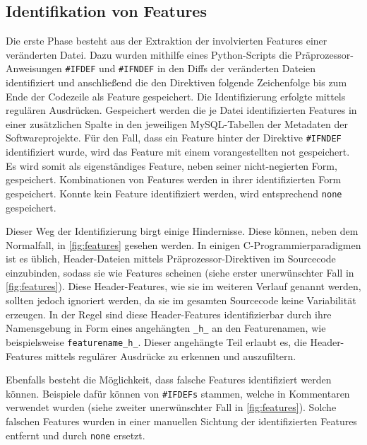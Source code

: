 \subsection*{Identifikation von Features}

Die erste Phase besteht aus der Extraktion der involvierten Features einer veränderten Datei. Dazu wurden mithilfe eines Python-Scripts die Präprozessor-Anweisungen \texttt{\#IFDEF} und \texttt{\#IFNDEF} in den Diffs der veränderten Dateien identifiziert und anschließend die den Direktiven folgende Zeichenfolge bis zum Ende der Codezeile als Feature gespeichert. Die Identifizierung erfolgte mittels regulären Ausdrücken. Gespeichert werden die je Datei identifizierten Features in einer zusätzlichen Spalte in den jeweiligen MySQL-Tabellen der Metadaten der Softwareprojekte. Für den Fall, dass ein Feature hinter der Direktive \texttt{\#IFNDEF} identifiziert wurde, wird das Feature mit einem vorangestellten \glqq not\grqq{} gespeichert. Es wird somit als eigenständiges Feature, neben seiner nicht-negierten Form, gespeichert. Kombinationen von Features werden in ihrer identifizierten Form gespeichert. Konnte kein Feature identifiziert werden, wird entsprechend \glqq \texttt{none}\grqq{} gespeichert.

Dieser Weg der Identifizierung birgt einige Hindernisse. Diese können, neben dem Normalfall, in \autoref{fig:features} gesehen werden. In einigen C-Programmierparadigmen ist es üblich, Header-Dateien mittels Präprozessor-Direktiven im Sourcecode einzubinden, sodass sie wie Features scheinen (siehe erster unerwünschter Fall in \autoref{fig:features}). Diese \glqq Header-Features\grqq{}, wie sie im weiteren Verlauf genannt werden, sollten jedoch ignoriert werden, da sie im gesamten Sourcecode keine Variabilität erzeugen. In der Regel sind diese Header-Features identifizierbar durch ihre Namensgebung in Form eines angehängten \texttt{\_h\_} an den Featurenamen, wie beispielsweise \texttt{featurename\_h\_}. Dieser angehängte Teil erlaubt es, die Header-Features mittels regulärer Ausdrücke zu erkennen und auszufiltern. 

Ebenfalls besteht die Möglichkeit, dass \glqq falsche\grqq{} Features identifiziert werden können. Beispiele dafür können von \texttt{\#IFDEFs} stammen, welche in Kommentaren verwendet wurden (siehe zweiter unerwünschter Fall in \autoref{fig:features}). Solche falschen Features wurden in einer manuellen Sichtung der identifizierten Features entfernt und durch \glqq \texttt{none}\grqq{} ersetzt.

